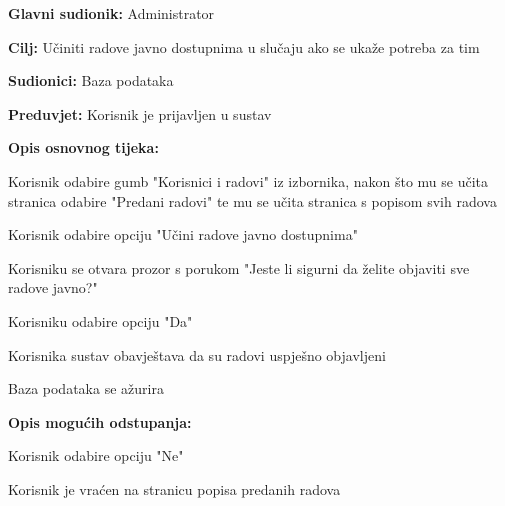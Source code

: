 					\begin{packed_item}
						
						\item \textbf{Glavni sudionik: } Administrator
						\item  \textbf{Cilj:} Učiniti radove javno dostupnima u slučaju ako se ukaže potreba za tim
						\item  \textbf{Sudionici:} Baza podataka
						\item  \textbf{Preduvjet:} Korisnik je prijavljen u sustav
						\item  \textbf{Opis osnovnog tijeka:}
						
						\item[] \begin{packed_enum}
							\item Korisnik odabire gumb "Korisnici i radovi" iz izbornika, nakon što mu se učita stranica odabire "Predani radovi" te mu se učita stranica s popisom svih radova
							\item Korisnik odabire opciju "Učini radove javno dostupnima"
							\item Korisniku se otvara prozor s porukom "Jeste li sigurni da želite objaviti sve radove javno?"
							\item Korisniku odabire opciju "Da"
							\item Korisnika sustav obavještava da su radovi uspješno objavljeni
							\item Baza podataka se ažurira
							
						\end{packed_enum}
						
						\item \textbf{Opis mogućih odstupanja:}
						\item[] \begin{packed_enum}
							
							\item[4.a] Korisnik odabire opciju "Ne"
							\item[] \begin{packed_enum}
								\item[1.] Korisnik je vraćen na stranicu popisa predanih radova
							\end{packed_enum} 
						\end{packed_enum}
						
					\end{packed_item}


